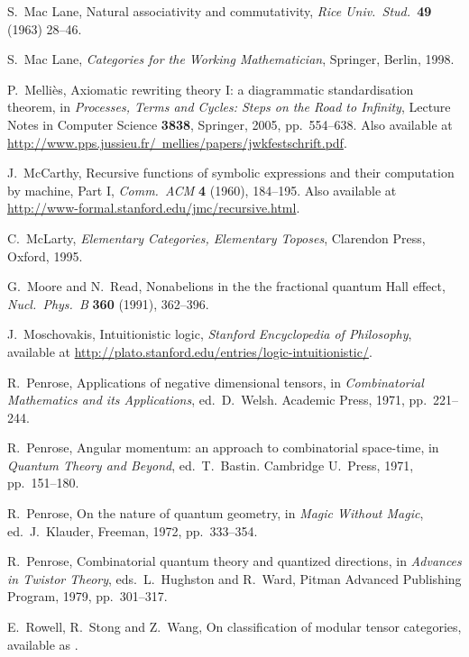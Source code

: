 \documentclass[12pt]{article}
\begin{document}
\begin{thebibliography}{99}
 S.\ Mac Lane, Natural associativity and 
commutativity, {\sl Rice Univ.\ Stud.\ }{\bf 49} (1963) 28--46.

 S.\ Mac Lane, {\sl Categories for the 
Working Mathematician}, Springer, Berlin, 1998.

 P.\ Melli\`es, Axiomatic rewriting theory I: a
diagrammatic standardisation theorem, in {\sl Processes, Terms and
Cycles: Steps on the Road to Infinity}, Lecture Notes in Computer
Science {\bf 3838}, Springer, 2005, pp.\ 554--638.  Also available
at 
\href{http://www.pps.jussieu.fr/~mellies/papers/jwkfestschrift.pdf}
{http://www.pps.jussieu.fr/~mellies/papers/jwkfestschrift.pdf}.

 J.\ McCarthy, Recursive functions of symbolic
expressions and their computation by machine, Part I, 
{\sl Comm.\ ACM} {\bf 4} (1960), 184--195.  Also available at 
\href{http://www-formal.stanford.edu/jmc/recursive.html}
{http://www-formal.stanford.edu/jmc/recursive.html}.

 C.\ McLarty, {\sl Elementary Categories, 
Elementary Toposes}, Clarendon Press, Oxford, 1995.

 G.\ Moore and N.\ Read, Nonabelions in the 
the fractional quantum Hall effect, {\sl Nucl.\ Phys.\ B} 
{\bf 360} (1991), 362--396.

 J.\ Moschovakis, Intuitionistic logic,
{\sl Stanford Encyclopedia of Philosophy}, available at \hfill \break
\href{http://plato.stanford.edu/entries/logic-intuitionistic/}
{http://plato.stanford.edu/entries/logic-intuitionistic/}.

R.\ Penrose, Applications of negative dimensional tensors,
in \textsl{Combinatorial Mathematics and its Applications}, ed.\
D.~Welsh. Academic Press, 1971, pp.\ 221--244.

R.\ Penrose, Angular momentum: an approach to combinatorial
space-time, in \textsl{Quantum Theory and Beyond}, ed.\
T.~Bastin. Cambridge U.\ Press, 1971, pp.\ 151--180.

R.\ Penrose, On the nature of quantum geometry, in \textsl{Magic
Without Magic}, ed.\ J.\ Klauder, Freeman, 1972, pp.\ 333--354.

R.\ Penrose, Combinatorial quantum theory and quantized directions,
in \textsl{Advances in Twistor Theory}, eds.\ L.\ Hughston 
and R.\ Ward, Pitman Advanced Publishing Program, 1979, pp.\ 301--317.

\bibitem{RSW} E.\ Rowell, R.\ Stong and Z.\ Wang, On classification
of modular tensor categories, available as .


\end{thebibliography}
\end{document}
